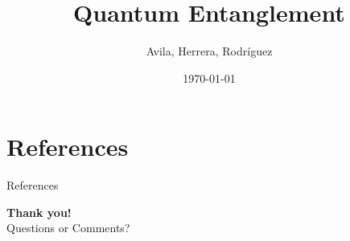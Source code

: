 \documentclass[aspectratio=169,sn-mathphys-num]{beamer}
\title{Quantum Entanglement}
\subtitle{}
\author{Avila, Herrera, Rodríguez}
\institute{Universidad Distrital Francisco José de Caldas}
\date{\today}
\begin{document}
\begin{frame}
	\titlepage
\end{frame}



\section{References}
\begin{frame}[allowframebreaks]{References}
	\printbibliography
	\nocite{*}
\end{frame}

\begin{frame}[plain]
	\centering
	\vspace{1cm}
	{\Huge \textbf{Thank you!}}\\[1cm]
	{\large Questions or Comments?}
\end{frame}
\end{document}
